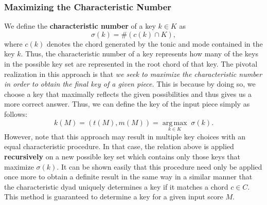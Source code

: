 \documentclass[11pt]{article}
\DeclareMathOperator*{\argmax}{arg\,max}
\begin{document}
\subsubsection{Maximizing the Characteristic Number}

We define the {\bf characteristic number} of a key $k\in K$ as 
\[\sigma(k) = \#(c(k) \cap K),\] 
where $c(k)$ denotes the chord generated by the tonic and mode contained in the key $k$. Thus, the characteristic number of a key represents how many of the keys in the possible key set are represented in the root chord of that key. The pivotal realization in this approach is that {\it we seek to maximize the characteristic number in order to obtain the final key of a given piece.} This is because by doing so, we choose a key that maximally reflects the given possibilities and thus gives us a more correct answer. Thus, we can define the key of the input piece simply as follows:
\[k(M) = (t(M), m(M)) = \underset{k\in K}{\argmax}\; \sigma(k).\]
However, note that this approach may result in multiple key choices with an equal characteristic procedure. In that case, the relation above is applied {\bf recursively} on a new possible key set which contains only those keys that maximize $\sigma(k)$. It can be shown easily that this procedure need only be applied once more to obtain a definite result in the same way in a similar manner that the characteristic dyad uniquely determines a key if it matches a chord $c\in C$. This method is guaranteed to determine a key for a given input score $M$.
\end{document}
